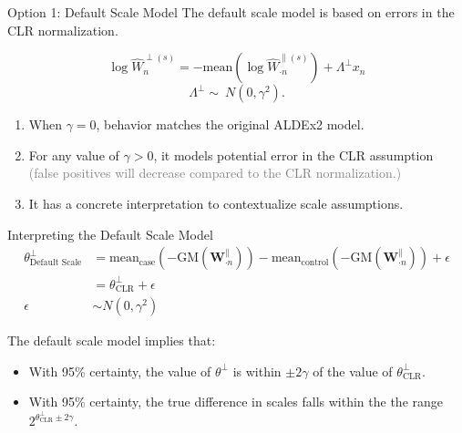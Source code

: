 \documentclass[
  ignorenonframetext,
]{beamer}
\providecommand{\tightlist}{%
  \setlength{\itemsep}{0pt}\setlength{\parskip}{0pt}}
\begin{document}
\begin{frame}{Option 1: Default Scale Model}
\protect\hypertarget{option-1-default-scale-model}{}
The default scale model is based on errors in the CLR normalization.

\[\log \hat{W}_{n}^{\perp(s)} = - \mathrm{mean} \left(\log \hat{W}^{\parallel (s)}_{\cdot n}\right) + \Lambda^\perp x_{n}\]
\[\Lambda^\perp  \sim \ N(0, \gamma^2).\] \pause 

\begin{enumerate}
\tightlist
\item
  When \(\gamma = 0\), behavior matches the original ALDEx2 model.
\end{enumerate}

\pause

\begin{enumerate}
\setcounter{enumi}{1}
\tightlist
\item
  For any value of \(\gamma > 0\), it models potential error in the CLR
  assumption
  \textcolor{gray}{(false positives will decrease compared to the CLR normalization.)}
\end{enumerate}

\pause

\begin{enumerate}
\setcounter{enumi}{2}
\tightlist
\item
  It has a concrete interpretation to contextualize scale assumptions.
\end{enumerate}
\end{frame}

\begin{frame}{Interpreting the Default Scale Model}
\protect\hypertarget{interpreting-the-default-scale-model}{}
\begin{align*}
\theta^\perp_{\text{Default Scale}} &= \text{mean}_{\text{case}}(-\text{GM}( \mathbf{W}_{\cdot n}^\parallel)) - \text{mean}_{\text{control}}(-\text{GM}( \mathbf{W}_{\cdot n}^\parallel)) + \epsilon\\
&= \theta^\perp_{\text{CLR}} + \epsilon\\
\epsilon &\sim N(0, \gamma^2)
\end{align*}

\pause

The default scale model implies that:

\pause

\begin{itemize}
\tightlist
\item
  With 95\% certainty, the value of \(\theta^\perp\) is within
  \(\pm 2 \gamma\) of the value of \(\theta^\perp_{\text{CLR}}\).
\end{itemize}

\pause

\begin{itemize}
\tightlist
\item
  With 95\% certainty, the true difference in scales falls within the
  the range \(2^{\theta_{\text{CLR}}^\perp \pm 2 \gamma}\).
\end{itemize}
\end{frame}
\end{document}
